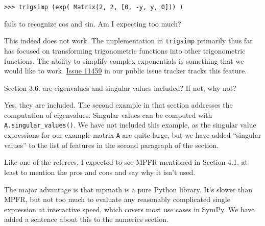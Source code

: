 \documentclass[answers,12pt]{exam}
\begin{document}
\begin{questions}
\begin{verbatim}
>>> trigsimp (exp( Matrix(2, 2, [0, -y, y, 0])) )
\end{verbatim}
fails to recognize cos and
sin. Am I expecting too much?
\begin{solution}
  This indeed does not work. The implementation in \verb|trigsimp| primarily
  thus far has focused on transforming trigonometric functions into other
  trigonometric functions. The ability to simplify complex exponentials is
  something that we would like to work.
  \href{https://github.com/sympy/sympy/issues/11459}{Issue 11459} in our
  public issue tracker tracks this feature.
\end{solution}
\question Section 3.6: are eigenvalues and singular
values included? If not, why not?
\begin{solution}
Yes, they are included.  The second example in that section addresses the computation of
eigenvalues.  Singular values can be computed with
\texttt{A.singular\_values()}. We have not included this example, as the
singular value expressions for our example matrix \texttt{A} are quite large,
but we have added ``singular values'' to the list of features in the second
paragraph of the section.
\end{solution}
\question Like one of the referees, I expected to
see MPFR mentioned in Section 4.1, at least to mention the pros and cons and
say why it isn't used.
\begin{solution}

  The major advantage is that mpmath is a pure Python library. It's slower
  than MPFR, but not too much to evaluate any reasonably complicated single
  expression at interactive speed, which covers most use cases in SymPy. We
  have added a sentence about this to the numerics section.


\end{solution}
\end{questions}
\end{document}
